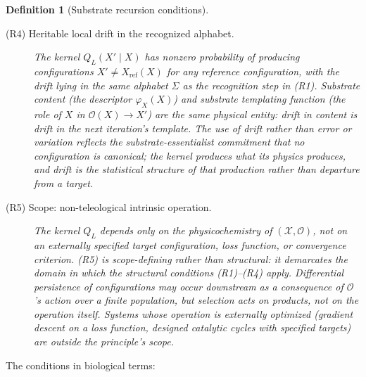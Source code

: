 \documentclass[aps,prx,reprint,amsmath,amssymb,floatfix,superscriptaddress,nofootinbib]{revtex4-2}
\theoremstyle{plain-thm}
\theoremstyle{definition-thm}
\newtheorem{definition}[theorem]{Definition}
\newcommand{\descX}{\varphi_X}
\newcommand{\Xset}{\mathcal{X}}
\newcommand{\Op}{\mathcal{O}}
\begin{document}
\begin{definition}[Substrate recursion conditions]
\begin{description}
\item[(R4) Heritable local drift in the recognized alphabet.] The kernel $Q_L(X' \mid X)$ has nonzero probability of producing configurations $X' \neq X_{\mathrm{ref}}(X)$ for any reference configuration, with the drift lying in the same alphabet $\Sigma$ as the recognition step in (R1). Substrate content (the descriptor $\descX(X)$) and substrate templating function (the role of $X$ in $\Op(X) \to X'$) are the same physical entity: drift in content is drift in the next iteration's template. The use of \emph{drift} rather than \emph{error} or \emph{variation} reflects the substrate-essentialist commitment that no configuration is canonical; the kernel produces what its physics produces, and drift is the statistical structure of that production rather than departure from a target.

\item[(R5) Scope: non-teleological intrinsic operation.] The kernel $Q_L$ depends only on the physicochemistry of $(\Xset, \Op)$, not on an externally specified target configuration, loss function, or convergence criterion. (R5) is scope-defining rather than structural: it demarcates the domain in which the structural conditions (R1)--(R4) apply. Differential persistence of configurations may occur downstream as a consequence of $\Op$'s action over a finite population, but selection acts on products, not on the operation itself. Systems whose operation is externally optimized (gradient descent on a loss function, designed catalytic cycles with specified targets) are outside the principle's scope.
\end{description}
\end{definition}

The conditions in biological terms:
\end{document}
